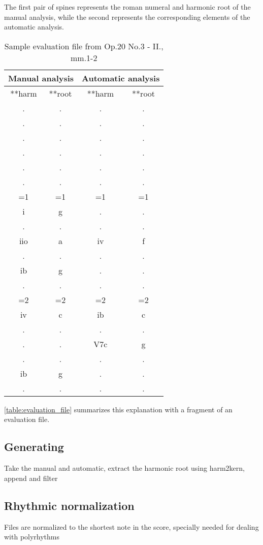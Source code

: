 	The first pair of spines represents the roman numeral and harmonic root of the manual analysis, while the second represents the corresponding elements of the automatic analysis.

	\begin{table}[tbp]
	\centering
	\begin{tabular}{|cc|cc|}
	\hline
	\multicolumn{2}{|c|}{Manual analysis} & \multicolumn{2}{c|}{Automatic analysis} \\ \hline
	**harm & **root & **harm & **root \\
	. & . & . & . \\
	. & . & . & . \\
	. & . & . & . \\
	. & . & . & . \\
	. & . & . & . \\
	. & . & . & . \\
	=1 & =1 & =1 & =1 \\
	i & g & . & . \\
	. & . & . & . \\
	iio & a & iv & f \\
	. & . & . & . \\
	ib & g & . & . \\
	. & . & . & . \\
	=2 & =2 & =2 & =2 \\
	iv & c & ib & c \\
	. & . & . & . \\
	. & . & V7c & g \\
	. & . & . & . \\
	ib & g & . & . \\
	. & . & . & . \\ \hline
	\end{tabular}
	\caption{Sample evaluation file from Op.20 No.3 - II., mm.1-2}
	\label{table:evaluation_file}
	\end{table}

	\autoref{table:evaluation_file} summarizes this explanation with a fragment of an evaluation file.

  \subsection{Generating}
  Take the manual and automatic, extract the harmonic root using harm2kern, append and filter
  \subsection{Rhythmic normalization}
  Files are normalized to the shortest note in the score, specially needed for dealing with polyrhythms
